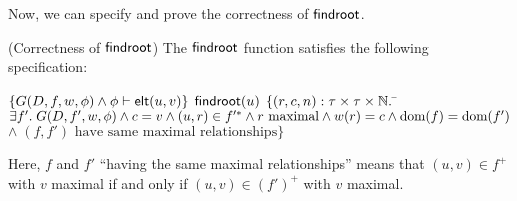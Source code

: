 Now, we can specify and prove the correctness of $\mathsf{findroot}$. 

\begin{lemma}{(Correctness of $\mathsf{findroot}$)}
The $\mathsf{findroot}$ function satisfies the following specification:
\begin{specification}
\nextline $\{G(D, f, w, \phi) \land {\phi} \vdash \mathsf{elt}({u}, {v})\}$
\nextline $\mathsf{findroot}(u)$
\nextline $\{(r,c,n):\tau \times \tau \times \mathbb{N}.$ 
\nextline\;\;\= $\exists f'.\; G(D, f', w, \phi) \land c = v \land (u,r) \in f'^{*} \land r \mbox{ maximal} \land w(r) = c \land \mbox{dom}({f}) = \mbox{dom}({f'})$
\nextline\> $\land\; (f,f')\mbox{ have same maximal relationships}\}$
\end{specification}
\end{lemma}

Here, $f$ and $f'$ ``having the same maximal relationships'' means that $(u,v) \in f^+$ with $v$ maximal
if and only if $(u, v) \in (f')^+$ with $v$ maximal. 

